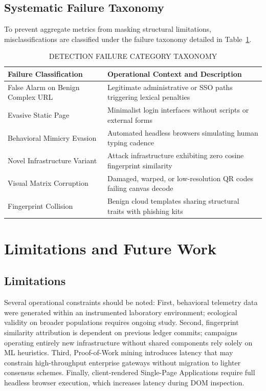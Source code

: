 \documentclass[conference]{IEEEtran}
\begin{document}
\subsection{Systematic Failure Taxonomy}
To prevent aggregate metrics from masking structural limitations, misclassifications are classified
under the failure taxonomy detailed in Table~\ref{tab:fail}.

\begin{table}[!t]
\caption{DETECTION FAILURE CATEGORY TAXONOMY}
\label{tab:fail}
\centering
\scriptsize
\setlength{\tabcolsep}{3pt}
\begin{tabularx}{\columnwidth}{|>{\raggedright\arraybackslash}p{}|>{\raggedright\arraybackslash}X|}
\hline
\textbf{Failure Classification} & \textbf{Operational Context and Description} \\ \hline
False Alarm on Benign Complex URL & Legitimate administrative or SSO paths triggering lexical penalties \\ \hline
Evasive Static Page & Minimalist login interfaces without scripts or external forms \\ \hline
Behavioral Mimicry Evasion & Automated headless browsers simulating human typing cadence \\ \hline
Novel Infrastructure Variant & Attack infrastructure exhibiting zero cosine fingerprint similarity \\ \hline
Visual Matrix Corruption   & Damaged, warped, or low-resolution QR codes failing canvas decode \\ \hline
Fingerprint Collision     & Benign cloud templates sharing structural traits with phishing kits \\ \hline
\end{tabularx}
\end{table}

\section{Limitations and Future Work} \label{sec:limits}

\subsection{Limitations}
Several operational constraints should be noted:
First, behavioral telemetry data were generated within an instrumented laboratory environment;
ecological validity on broader populations requires ongoing study.
Second, fingerprint similarity attribution is dependent on previous ledger commits; campaigns
operating entirely new infrastructure without shared components rely solely on ML heuristics.
Third, Proof-of-Work mining introduces latency that may constrain high-throughput enterprise gateways
without migration to lighter consensus schemes.
Finally, client-rendered Single-Page Applications require full headless browser execution, which
increases latency during DOM inspection.
\end{document}
